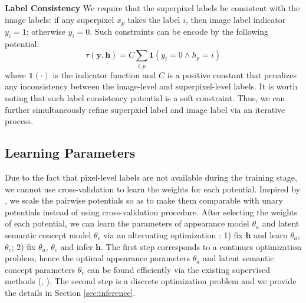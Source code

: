 \textbf{Label Consistency}
We require that the superpixel labels be consistent with the image labels: if any superpixel $x_p$ takes the label $i$, then image label indicator $y_i=1$; otherwise $y_i=0$. Such constraints can be encode by the following potential:
\begin{equation}
    \tau(\boldsymbol{y},\boldsymbol{h}) =
    C  \sum_{i,p} \mathbf{1}(y_i=0 \land h_p=i)
\end{equation}
where $\mathbf{1}(\cdot)$ is the indicator function and $C$ is a positive constant that penalizes any inconsistency between the image-level and superpixel-level labels. It is worth noting that such label consistency potential is a soft constraint. Thus, we can further simultaneously refine superpxiel label and image label via an iterative process.

\subsection{Learning Parameters}
\label{learningparameters}
Due to the fact that pixel-level labels are not available during the training stage, we cannot use cross-validation \cite{kohli2009robust} to learn the weights for each potential.
Inspired by \cite{vezhnevets2011weakly}, we scale the pairwise potentials so as to make them comparable with unary potentials instead of using cross-validation procedure.
After selecting the weights of each potential, we can learn the parameters of appearance model $\theta_a$ and latent semantic concept model $\theta_c$ via an alternating optimization \cite{vezhnevets2011weakly}: 1) fix $\boldsymbol{h}$ and learn $\theta_a$, $\theta_c$; 2) fix $\theta_a$, $\theta_c$ and infer $\boldsymbol{h}$.
The first step corresponds to a continues optimization problem, hence the optimal appearance parameters $\theta_a$ and latent semantic concept parameters $\theta_c$ can be found efficiently via the existing supervised methods (\eg, \cite{shotton2006textonboost}). The second step is a discrete optimization problem and we provide the details in Section \ref{sec:inference}.


